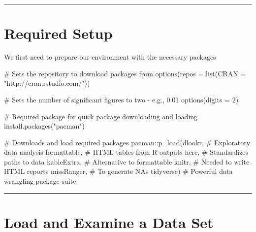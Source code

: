 \documentclass[
  letterpaper,
  DIV=11,
  numbers=noendperiod]{scrreprt}
\newenvironment{Shaded}{\begin{snugshade}}{\end{snugshade}}
\newcommand{\AttributeTok}[1]{\textcolor[rgb]{0.40,0.45,0.13}{#1}}
\newcommand{\CommentTok}[1]{\textcolor[rgb]{0.37,0.37,0.37}{#1}}
\newcommand{\DecValTok}[1]{\textcolor[rgb]{0.68,0.00,0.00}{#1}}
\newcommand{\FunctionTok}[1]{\textcolor[rgb]{0.28,0.35,0.67}{#1}}
\newcommand{\NormalTok}[1]{\textcolor[rgb]{0.00,0.23,0.31}{#1}}
\newcommand{\SpecialCharTok}[1]{\textcolor[rgb]{0.37,0.37,0.37}{#1}}
\newcommand{\StringTok}[1]{\textcolor[rgb]{0.13,0.47,0.30}{#1}}
\begin{document}
\begin{center}\rule{0.5\linewidth}{0.5pt}\end{center}

\hypertarget{required-setup}{%
\section{Required Setup}\label{required-setup}}

We first need to prepare our environment with the necessary packages

\begin{Shaded}
\begin{Highlighting}[]
\CommentTok{\# Sets the repository to download packages from}
\FunctionTok{options}\NormalTok{(}\AttributeTok{repos =} \FunctionTok{list}\NormalTok{(}\AttributeTok{CRAN =} \StringTok{"http://cran.rstudio.com/"}\NormalTok{))}

\CommentTok{\# Sets the number of significant figures to two {-} e.g., 0.01}
\FunctionTok{options}\NormalTok{(}\AttributeTok{digits =} \DecValTok{2}\NormalTok{)}

\CommentTok{\# Required package for quick package downloading and loading }
\FunctionTok{install.packages}\NormalTok{(}\StringTok{"pacman"}\NormalTok{)}

\CommentTok{\# Downloads and load required packages}
\NormalTok{pacman}\SpecialCharTok{::}\FunctionTok{p\_load}\NormalTok{(dlookr, }\CommentTok{\# Exploratory data analysis}
\NormalTok{               formattable, }\CommentTok{\# HTML tables from R outputs}
\NormalTok{               here, }\CommentTok{\# Standardizes paths to data}
\NormalTok{               kableExtra, }\CommentTok{\# Alternative to formattable}
\NormalTok{               knitr, }\CommentTok{\# Needed to write HTML reports}
\NormalTok{               missRanger, }\CommentTok{\# To generate NAs}
\NormalTok{               tidyverse) }\CommentTok{\# Powerful data wrangling package suite}
\end{Highlighting}
\end{Shaded}

\begin{center}\rule{0.5\linewidth}{0.5pt}\end{center}

\hypertarget{load-and-examine-a-data-set}{%
\section{Load and Examine a Data
Set}\label{load-and-examine-a-data-set}}
\end{document}
